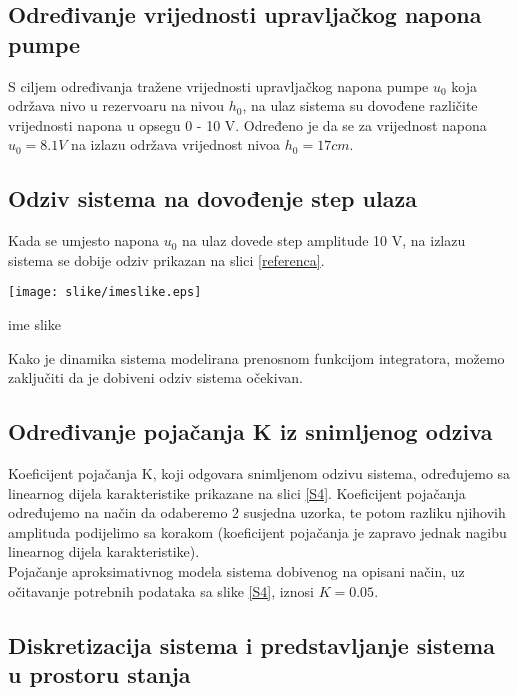 \subsection{Određivanje vrijednosti upravljačkog napona pumpe}

S ciljem određivanja tražene vrijednosti upravljačkog napona pumpe $u_{0}$ koja održava nivo u rezervoaru na nivou $h_{0}$, na ulaz sistema su dovođene različite vrijednosti napona u opsegu 0 - 10 V. Određeno je da se za vrijednost napona $u_{0} = 8.1 V$ na izlazu održava vrijednost nivoa $h_{0} = 17 cm$.

\subsection{Odziv sistema na dovođenje step ulaza}

Kada se umjesto napona $u_{0}$ na ulaz dovede step amplitude 10 V, na izlazu sistema se dobije odziv prikazan na slici \ref{referenca}.

\begin{center}
    \captionsetup{type=figure}
    \begin{center}
        \texttt{[image: slike/imeslike.eps]}
        \caption{ime slike}
        \label{referenca}
    \end{center}
\end{center}

Kako je dinamika sistema modelirana prenosnom funkcijom integratora, možemo zaključiti da je dobiveni odziv sistema očekivan. 

\subsection{Određivanje pojačanja K iz snimljenog odziva}


Koeficijent pojačanja K, koji odgovara snimljenom odzivu sistema, određujemo sa linearnog dijela karakteristike prikazane na slici \ref{S4}. Koeficijent pojačanja određujemo na način da odaberemo 2 susjedna uzorka, te potom razliku njihovih amplituda podijelimo sa korakom (koeficijent pojačanja je zapravo jednak nagibu linearnog dijela karakteristike). \\

Pojačanje aproksimativnog modela sistema dobivenog na opisani način, uz očitavanje potrebnih podataka sa slike \ref{S4}, iznosi $K = 0.05$.

\subsection{Diskretizacija sistema i predstavljanje sistema u prostoru stanja}

